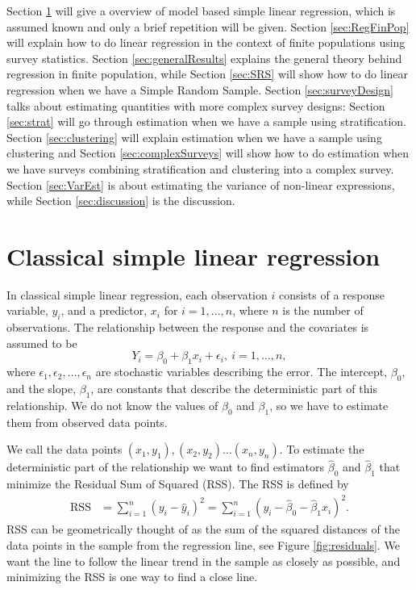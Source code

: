 \documentclass{article}
\begin{document}
Section \ref{sec:modLinReg} will give a overview of model based simple
linear regression, which is assumed known and only a brief repetition will be given.
Section \ref{sec:RegFinPop} will explain how to do linear regression in the context of finite
populations using survey statistics. Section \ref{sec:generalResults} explains
the general theory behind regression in finite population, while Section \ref{sec:SRS} will show how to do linear
regression when we have a Simple Random Sample. Section \ref{sec:surveyDesign}
talks about estimating quantities with more complex survey designs: Section \ref{sec:strat} will go through
estimation when we have a sample using stratification. Section \ref{sec:clustering} will
explain estimation when we have a sample using clustering and Section \ref{sec:complexSurveys}
will show how to do estimation when we have surveys combining
stratification and clustering into a complex survey. Section \ref{sec:VarEst} is
about estimating the variance of non-linear expressions, while Section
\ref{sec:discussion} is the discussion.

\section{Classical simple linear regression} \label{sec:modLinReg}

In classical simple linear regression, each observation \(i\) consists of a
response variable, \(y_i\), and a predictor, \(x_i\) for \(i = 1, ..., n\), where \(n\) is the number of observations. The
relationship between the response and the covariates is assumed to be
\begin{equation*}
Y_i = \beta_0 + \beta_1 x_i + \epsilon_i,\ i = 1, \dots, n,
\end{equation*}
where \(\epsilon_1, \epsilon_2, \dots, \epsilon_n\) are stochastic variables
describing the error. The intercept, \(\beta_0\), and the slope, \(\beta_1\),
are constants that describe the deterministic part of this relationship.
We do not know the values of \(\beta_0\) and \(\beta_1\), so we have to estimate
them from observed data points.

We call the data points \((x_1, y_1), (x_2, y_2)
... (x_n, y_n)\). To estimate the deterministic part of the relationship we want
to find estimators \(\hat{\beta}_0\) and \(\hat{\beta}_1\) that minimize the
Residual Sum of Squared (RSS). The RSS is defined by
\begin{align*}
  \mathrm{RSS} &= \sum_{i = 1}^n \left( y_i - \hat{y}_i \right)^2 
  = \sum_{i = 1}^n \left( y_i - \hat{\beta}_0 - \hat{\beta}_1 x_i \right)^2.
\end{align*}
RSS can be geometrically thought of as the sum of the squared distances of
the data points in the sample from the regression line, see Figure
\ref{fig:residuals}. We want the line to follow the linear trend in the sample
as closely as possible, and minimizing the RSS is one way to find a close line.
\end{document}
